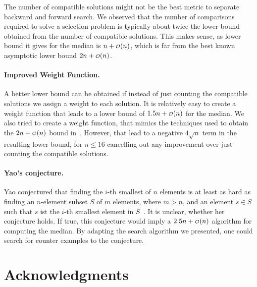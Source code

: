 \documentclass[twoside,leqno,twocolumn]{article}
\newcommand\smallO{
\mathchoice
{{\scriptstyle\mathcal{O}}}%
{{\scriptstyle\mathcal{O}}}%
{{\scriptscriptstyle\mathcal{O}}}%
{\scalebox{.50}{$\scriptscriptstyle\mathcal{O}$}}%
}
\begin{document}
The number of compatible solutions might not be the best metric to separate backward and forward search.
We observed that the number of comparisons required to solve a selection problem is typically about twice the lower bound obtained from the number of compatible solutions.
This makes sense, as lower bound it gives for the median is $n + \smallO(n)$, which is far from the best known asymptotic lower bound $2n + \smallO(n)$.

\paragraph{Improved Weight Function.}
A better lower bound can be obtained if instead of just counting the compatible solutions we assign a weight to each solution.
It is relatively easy to create a weight function that leads to a lower bound of $1.5n + \smallO(n)$ for the median.
We also tried to create a weight function, that mimics the techniques used to obtain the $2n + \smallO(n)$ bound in~\cite{bent1985finding}.
However, that lead to a negative $4\sqrt{n}$ term in the resulting lower bound, for $n \le 16$ cancelling out any improvement over just counting the compatible solutions.

\paragraph{Yao's conjecture.}
Yao conjectured that finding the $i$-th smallest of $n$ elements is at least as hard as finding an $n$-element subset $S$ of $m$ elements, where $m > n$, and an element $s \in S$ such that $s$ ist the $i$-th smallest element in $S$~\cite{yao1974lower}.
It is unclear, whether her conjecture holds.
If true, this conjecture would imply a $2.5n + \smallO(n)$ algorithm for computing the median.
By adapting the search algorithm we presented, one could search for counter examples to the conjecture.



\section*{Acknowledgments}




\clearpage
\appendix
\end{document}
